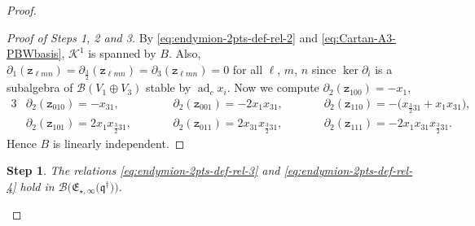 \documentclass[10pt,a4paper]{amsart}
\numberwithin{equation}{section}
\newtheorem{stepi}{Step}
\newcommand{\adc}{\operatorname{ad}_c}
\newcommand{\toba}{\mathscr B}
\newcommand{\K}{{\mathcal{K}}}
\newcommand{\zt}{\mathtt{z}}
\newcommand{\eny}{\mathfrak{E}}
\newcommand{\enyIIb}[1]{\eny_{\star,#1}}
\newcommand{\bq}{\mathfrak{q}}
\newcommand{\bqs}{\bq^{\dagger}}
\newcommand{\tresdos}{\frac{3}{2}}
\begin{document}
\begin{proof}
\begin{proof}[Proof of Steps 1, 2 and 3]
By \eqref{eq:endymion-2pts-def-rel-2} and \eqref{eq:Cartan-A3-PBWbasis}, $\K^1$ is spanned by $B$.
Also, $\partial_1(\zt_{\ell mn})=\partial_{\tresdos}(\zt_{\ell mn})=\partial_3(\zt_{\ell mn})=0$ for all $\ell$, $m$, $n$ since $\ker \partial_i$ is a subalgebra of $\toba(V_1\oplus V_3)$ stable by $\adc x_i$. Now we compute $\partial_2(\zt_{100})= -x_1$,
\begin{alignat*}{3}
&\partial_2 (\zt_{010}) = -x_{31}, &&
\partial_2 (\zt_{001}) = -2x_1x_{31}, &&
\partial_2 (\zt_{110}) = -\big(x_{\tresdos31}+x_1x_{31}\big),
\\
&\partial_2 (\zt_{101}) = 2x_1x_{\tresdos31},\qquad &&
\partial_2 (\zt_{011}) = 2x_{31}x_{\tresdos31},\qquad &&
\partial_2 (\zt_{111}) = -2x_1x_{31}x_{\tresdos31}.
\end{alignat*}
Hence $B$ is linearly independent.
\end{proof}

\begin{stepi}\label{lem:endymion-2pts-def-rel-1}
The relations \eqref{eq:endymion-2pts-def-rel-3} and \eqref{eq:endymion-2pts-def-rel-4} hold in $\toba\big(\enyIIb{\infty}\big(\bqs\big)\big)$.
\end{stepi}


\end{proof}
\end{document}
